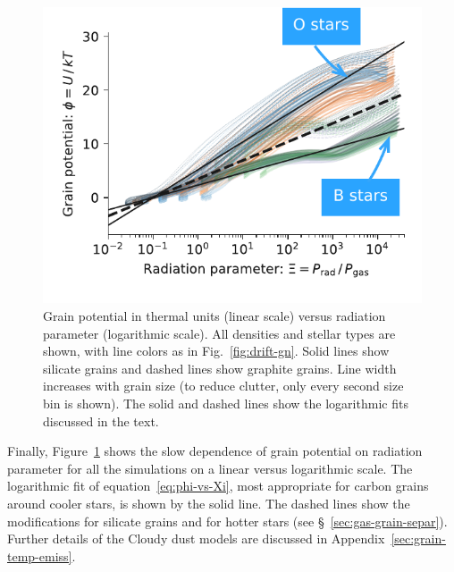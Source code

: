 \begin{figure}
  \centering
  \includegraphics[width=\linewidth]{figs/phi-versus-xi-annotate}
  \caption{Grain potential in thermal units (linear scale) versus
    radiation parameter (logarithmic scale). All densities and stellar
    types are shown, with line colors as in Fig.~\ref{fig:drift-gn}.
    Solid lines show silicate grains and dashed lines show graphite
    grains.  Line width increases with grain size (to reduce clutter,
    only every second size bin is shown).  The solid and dashed lines
    show the logarithmic fits discussed in the text.}
  \label{fig:phi-vs-Xi}
\end{figure}
Finally, Figure~\ref{fig:phi-vs-Xi} shows the slow dependence of grain
potential on radiation parameter for all the simulations on a linear
versus logarithmic scale.  The logarithmic fit of
equation~\eqref{eq:phi-vs-Xi}, most appropriate for carbon grains
around cooler stars, is shown by the solid line.  The dashed lines
show the modifications for silicate grains and for hotter stars (see
\S~\ref{sec:gas-grain-separ}).  Further details of the Cloudy dust
models are discussed in Appendix~\ref{sec:grain-temp-emiss}.





